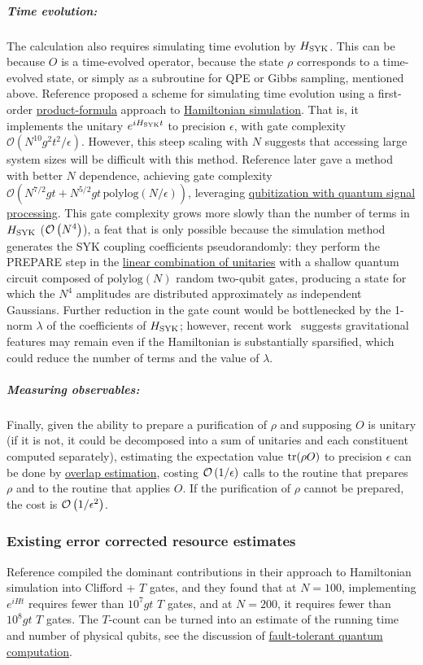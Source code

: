 \begin{refsection}
\subparagraph{Time evolution:} 
The calculation also requires simulating time evolution by $H_{\rm SYK}$. This can be because $O$ is a time-evolved operator, because the state $\rho$ corresponds to a time-evolved state, or simply as a subroutine for QPE or Gibbs sampling, mentioned above.   Reference \cite{garcia-alvarez2017} proposed a scheme for simulating time evolution using a first-order \hyperref[prim:ProductFormulae]{product-formula} approach to \hyperref[prim:HamiltonianSimulation]{Hamiltonian simulation}. That is, it implements the unitary $e^{iH_{\rm SYK}t}$ to precision $\epsilon$, with gate complexity $\mathcal{O}(N^{10}g^2t^2/\epsilon)$.  However, this steep scaling with $N$ suggests that accessing large system sizes will be difficult with this method. 
Reference \cite{babbush2019SYKmodel} later gave a method with better $N$ dependence, achieving gate complexity $\mathcal{O}(N^{7/2}gt +N^{5/2}gt\,\text{polylog}(N/\epsilon))$, leveraging \hyperref[prim:QSPqubitization]{qubitization with quantum signal processing}. This gate complexity grows more slowly than the number of terms in $H_{\rm SYK}$ ($\mathcal{O}\left( N^4 \right)$), a feat that is only possible because the simulation method generates the SYK coupling coefficients pseudorandomly: they perform the PREPARE step in the \hyperref[prim:LCU]{linear combination of unitaries} with a shallow quantum circuit composed of $\mathrm{polylog}(N)$ random two-qubit gates, producing a state for which the $N^4$ amplitudes are distributed approximately as independent Gaussians.
Further reduction in the gate count would be bottlenecked by the 1-norm $\lambda$ of the coefficients of $H_{\rm SYK}$; however, recent work~\cite{Xu2020ASM} suggests gravitational features may remain even if the Hamiltonian is substantially sparsified, which could reduce the number of terms and the value of $\lambda$. 

\subparagraph{Measuring observables:} 

Finally, given the ability to prepare a purification of $\rho$ and supposing $O$ is unitary (if it is not, it could be decomposed into a sum of unitaries and each constituent computed separately), estimating the expectation value $\text{tr}(\rho O)$ to precision $\epsilon$ can be done by \hyperref[prim:AmpEst]{overlap estimation}, costing $\mathcal{O}\left( 1/\epsilon \right)$ calls to the routine that prepares $\rho$ and to the routine that applies $O$. If the purification of $\rho$ cannot be prepared, the cost is $\mathcal{O}\left( 1/\epsilon^2 \right)$.  

\subsubsection{Existing error corrected resource estimates} 
Reference \cite{babbush2019SYKmodel} compiled the dominant contributions in their approach to Hamiltonian simulation into Clifford + $T$ gates, and they found that at $N=100$, implementing $e^{iHt}$ requires fewer than $10^7 gt$ $T$ gates, and at $N=200$, it requires fewer than $10^8 gt$ $T$ gates.
The $T$-count can be turned into an estimate of the running time and number of physical qubits, see the discussion of \hyperref[prim:FTQC]{fault-tolerant quantum computation}.



\end{refsection}
